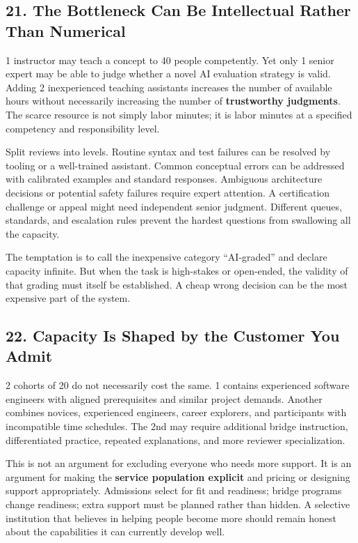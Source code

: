 \subsection*{21. The Bottleneck Can Be Intellectual Rather Than Numerical}

1 instructor may teach a concept to 40 people competently. Yet only 1 senior expert may be able to judge whether a novel AI evaluation strategy is valid. Adding 2 inexperienced teaching assistants increases the number of available hours without necessarily increasing the number of \textbf{trustworthy judgments}. The scarce resource is not simply labor minutes; it is labor minutes at a specified competency and responsibility level.

Split reviews into levels. Routine syntax and test failures can be resolved by tooling or a well-trained assistant. Common conceptual errors can be addressed with calibrated examples and standard responses. Ambiguous architecture decisions or potential safety failures require expert attention. A certification challenge or appeal might need independent senior judgment. Different queues, standards, and escalation rules prevent the hardest questions from swallowing all the capacity.

The temptation is to call the inexpensive category ``AI-graded'' and declare capacity infinite. But when the task is high-stakes or open-ended, the validity of that grading must itself be established. A cheap wrong decision can be the most expensive part of the system.

\subsection*{22. Capacity Is Shaped by the Customer You Admit}

2 cohorts of 20 do not necessarily cost the same. 1 contains experienced software engineers with aligned prerequisites and similar project demands. Another combines novices, experienced engineers, career explorers, and participants with incompatible time schedules. The 2nd may require additional bridge instruction, differentiated practice, repeated explanations, and more reviewer specialization.

This is not an argument for excluding everyone who needs more support. It is an argument for making the \textbf{service population explicit} and pricing or designing support appropriately. Admissions select for fit and readiness; bridge programs change readiness; extra support must be planned rather than hidden. A selective institution that believes in helping people become more should remain honest about the capabilities it can currently develop well.

